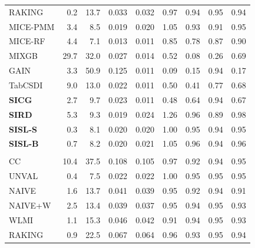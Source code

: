 \begin{landscape}
\begin{longtable}{lrrrrrrrr}
RAKING & \cellcolor{rankone}0.2 & 13.7 & 0.033 & 0.032 & \cellcolor{rankthree}0.97 & \cellcolor{ranktwo}0.94 & \cellcolor{rankone}0.95 & \cellcolor{ranktwo}0.94 \\
MICE-PMM & 3.4 & 8.5 & 0.019 & 0.020 & 1.05 & \cellcolor{rankthree}0.93 & 0.91 & \cellcolor{rankone}0.95 \\
MICE-RF & 4.4 & \cellcolor{rankone}7.1 & 0.013 & 0.011 & 0.85 & 0.78 & 0.87 & 0.90 \\
MIXGB & 29.7 & 32.0 & 0.027 & 0.014 & 0.52 & 0.08 & 0.26 & 0.69 \\
GAIN & 3.3 & 50.9 & 0.125 & 0.011 & 0.09 & 0.15 & \cellcolor{ranktwo}0.94 & 0.17 \\
TabCSDI & 9.0 & 13.0 & 0.022 & 0.011 & 0.50 & 0.41 & 0.77 & 0.68 \\
\textbf{SICG} & 2.7 & 9.7 & 0.023 & 0.011 & 0.48 & 0.64 & \cellcolor{ranktwo}0.94 & 0.67 \\
\textbf{SIRD} & 5.3 & 9.3 & 0.019 & 0.024 & 1.26 & \cellcolor{ranktwo}0.96 & 0.89 & \cellcolor{rankthree}0.98 \\
\textbf{SISL-S} & \cellcolor{ranktwo}0.3 & \cellcolor{ranktwo}8.1 & 0.020 & 0.020 & \cellcolor{rankone}1.00 & \cellcolor{rankone}0.95 & \cellcolor{ranktwo}0.94 & \cellcolor{rankone}0.95 \\
\textbf{SISL-B} & \cellcolor{rankthree}0.7 & \cellcolor{rankthree}8.2 & 0.020 & 0.021 & 1.05 & \cellcolor{ranktwo}0.96 & \cellcolor{ranktwo}0.94 & \cellcolor{ranktwo}0.96 \\
\addlinespace[3pt]
\multicolumn{9}{l}{\textbf{Binary \& Categorical Phase-One Covariates}} \\
\addlinespace[2pt]
CC & 10.4 & 37.5 & 0.108 & 0.105 & \cellcolor{ranktwo}0.97 & 0.92 & \cellcolor{ranktwo}0.94 & \cellcolor{rankone}0.95 \\
UNVAL & \cellcolor{rankone}0.4 & \cellcolor{rankone}7.5 & 0.022 & 0.022 & \cellcolor{rankone}1.00 & \cellcolor{rankone}0.95 & \cellcolor{rankone}0.95 & \cellcolor{rankone}0.95 \\
NAIVE & 1.6 & 13.7 & 0.041 & 0.039 & 0.95 & 0.92 & \cellcolor{ranktwo}0.94 & 0.91 \\
NAIVE+W & 2.5 & 13.4 & 0.039 & 0.037 & 0.95 & \cellcolor{ranktwo}0.94 & \cellcolor{rankone}0.95 & \cellcolor{rankthree}0.93 \\
WLMI & \cellcolor{rankthree}1.1 & 15.3 & 0.046 & 0.042 & 0.91 & \cellcolor{ranktwo}0.94 & \cellcolor{rankone}0.95 & \cellcolor{rankthree}0.93 \\
RAKING & \cellcolor{ranktwo}0.9 & 22.5 & 0.067 & 0.064 & \cellcolor{rankthree}0.96 & \cellcolor{rankthree}0.93 & \cellcolor{rankone}0.95 & \cellcolor{ranktwo}0.94 \\

\end{longtable}
\end{landscape}
